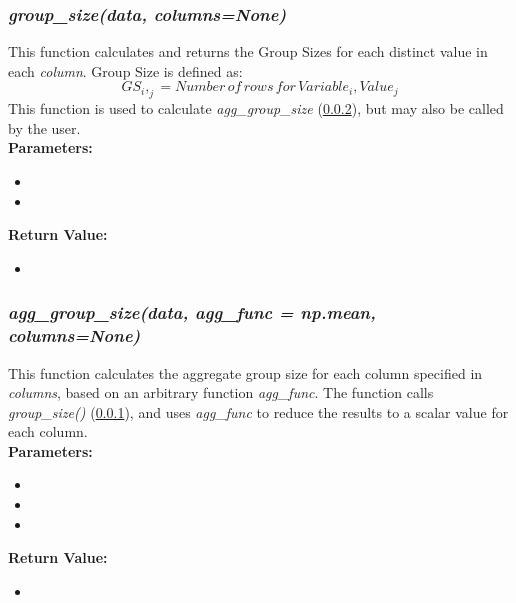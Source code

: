 \documentclass[titlepage, 11pt]{article}
\begin{document}
\subsubsection{\textit{group\_size(data, columns=None)}}
\label{grp_size}
This function calculates and returns the Group Sizes for each distinct value in each \textit{column}. Group Size is defined as:
\begin{equation}
    GS_i,_j = {Number\, of\, rows\, for\, Variable_i, Value_j}
\end{equation}
This function is used to calculate \textit{agg\_group\_size} (\ref{agrp_size}), but may also be called by the user. 
\\
\textbf{Parameters:}
\begin{itemize}
    \item \docdata
    \item \doccols
\end{itemize}
\textbf{Return Value:}
\begin{itemize}
    \item {} 
\end{itemize}

\subsubsection{\textit{agg\_group\_size(data, agg\_func = np.mean, columns=None)}}
\label{agrp_size}
This function calculates the aggregate group size for each column specified in \textit{columns}, based on an arbitrary function \textit{agg\_func}. 
The function calls \textit{group\_size()} (\ref{grp_size}), and uses \textit{agg\_func} to reduce the results to a scalar value for each column. 
\\
\textbf{Parameters:}
\begin{itemize}
    \item \docdata
    \item {}
    \item \doccols
\end{itemize}
\textbf{Return Value:}
\begin{itemize}
    \item {}
\end{itemize}
\end{document}
